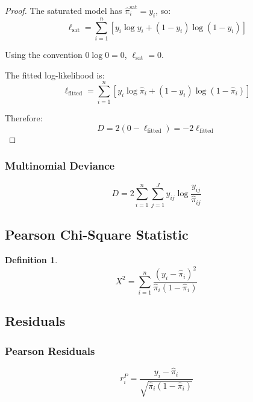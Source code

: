 \documentclass[11pt,letterpaper]{article}
\theoremstyle{definition}
\newtheorem{definition}{Definition}[section]
\begin{document}
\begin{proof}
The saturated model has $\hat{\pi}_i^{\text{sat}} = y_i$, so:
\begin{equation}
    \ell_{\text{sat}} = \sum_{i=1}^{n} [y_i \log y_i + (1-y_i)\log(1-y_i)]
\end{equation}

Using the convention $0 \log 0 = 0$, $\ell_{\text{sat}} = 0$.

The fitted log-likelihood is:
\begin{equation}
    \ell_{\text{fitted}} = \sum_{i=1}^{n} [y_i \log \hat{\pi}_i + (1-y_i)\log(1-\hat{\pi}_i)]
\end{equation}

Therefore:
\begin{equation}
    D = 2(0 - \ell_{\text{fitted}}) = -2\ell_{\text{fitted}}
\end{equation}
\end{proof}

\subsubsection{Multinomial Deviance}

\begin{equation}
    D = 2 \sum_{i=1}^{n} \sum_{j=1}^{J} y_{ij} \log\frac{y_{ij}}{\hat{\pi}_{ij}}
\end{equation}

\subsection{Pearson Chi-Square Statistic}

\begin{definition}
\begin{equation}
    X^2 = \sum_{i=1}^{n} \frac{(y_i - \hat{\pi}_i)^2}{\hat{\pi}_i(1-\hat{\pi}_i)}
\end{equation}
\end{definition}

\subsection{Residuals}

\subsubsection{Pearson Residuals}

\begin{equation}
    r_i^P = \frac{y_i - \hat{\pi}_i}{\sqrt{\hat{\pi}_i(1-\hat{\pi}_i)}}
    \label{eq:pearson-resid}
\end{equation}
\end{document}
